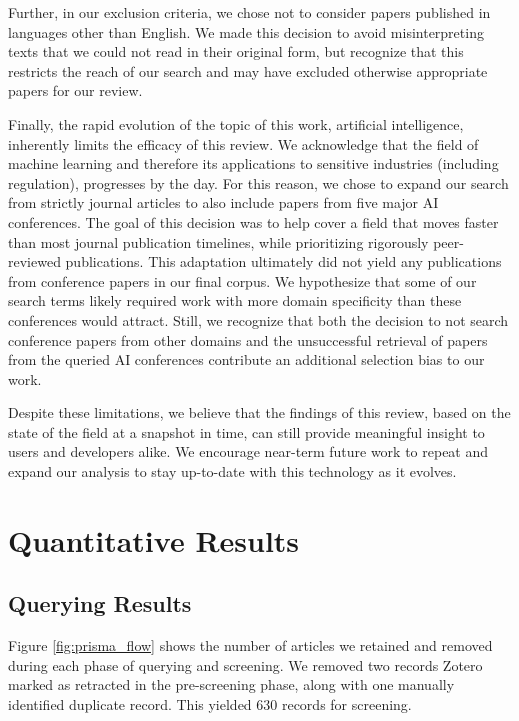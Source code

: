 \documentclass[authoryear,preprint,12pt]{elsarticle}
\begin{document}
Further, in our exclusion criteria, we chose not to consider papers published in
languages other than English. We made this decision to avoid misinterpreting
texts that we could not read in their original form, but recognize that this
restricts the reach of our search and may have excluded otherwise appropriate
papers for our review.

Finally, the rapid evolution of the topic of this work, artificial intelligence,
inherently limits the efficacy of this review. We acknowledge that the field of
machine learning and therefore its applications to sensitive industries
(including regulation), progresses by the day. For this reason, we chose to
expand our search from strictly journal articles to also include papers from
five major AI conferences. The goal of this decision was to help cover a field
that moves faster than most journal publication timelines, while prioritizing
rigorously peer-reviewed publications. This adaptation ultimately did not yield
any publications from conference papers in our final corpus. We hypothesize that
some of our search terms likely required work with more domain specificity than
these conferences would attract. Still, we recognize that both the decision to
not search conference papers from other domains and the unsuccessful retrieval
of papers from the queried AI conferences contribute an additional selection
bias to our work.

Despite these limitations, we believe that the findings of this review, based on
the state of the field at a snapshot in time, can still provide meaningful
insight to users and developers alike. We encourage near-term future work to
repeat and expand our analysis to stay up-to-date with this technology as it
evolves.

\section{Quantitative Results}
\label{sec:quantitative_results}

\subsection{Querying Results}

Figure \ref{fig:prisma_flow} shows the number of articles we retained and removed during each phase of querying and screening. We removed two records Zotero marked as retracted in the
pre-screening phase, along with one manually identified duplicate record. This
yielded 630 records for screening. 
\end{document}
